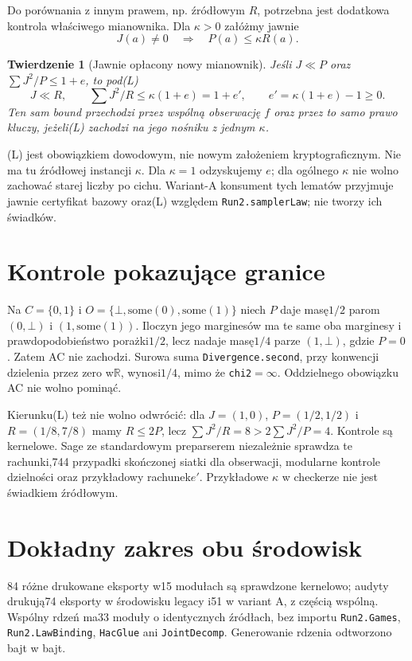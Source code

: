 \documentclass[11pt,a4paper]{article}
\newcommand{\code}[1]{\nolinkurl{#1}}
\newtheorem{theorem}{Twierdzenie}
\begin{document}
Do porównania z innym prawem, np. źródłowym $R$, potrzebna jest dodatkowa
kontrola właściwego mianownika. Dla $\kappa>0$ załóżmy jawnie
\[
 J(a)\ne0\quad\Longrightarrow\quad P(a)\le\kappa R(a).
\tag{L}
\]
\begin{theorem}[Jawnie opłacony nowy mianownik]
Jeśli $J\ll P$ oraz $\sum J^2/P\le1+e$, to pod(L)
\[
 J\ll R,\qquad \sum J^2/R\le\kappa(1+e)
       =1+e',\qquad e'=\kappa(1+e)-1\ge0.
\]
Ten sam bound przechodzi przez wspólną obserwację $f$ oraz przez to samo
prawo kluczy, jeżeli(L) zachodzi na jego nośniku z jednym $\kappa$.
\end{theorem}
(L) jest obowiązkiem dowodowym, nie nowym założeniem kryptograficznym.
Nie ma tu źródłowej instancji $\kappa$. Dla $\kappa=1$ odzyskujemy $e$;
dla ogólnego $\kappa$ nie wolno zachować starej liczby po cichu.
Wariant-A konsument tych lematów przyjmuje jawnie certyfikat bazowy
oraz(L) względem \code{Run2.samplerLaw}; nie tworzy ich świadków.

\section{Kontrole pokazujące granice}
Na $C=\{0,1\}$ i $O=\{\bot,\mathrm{some}(0),\mathrm{some}(1)\}$
niech $P$ daje masę$1/2$ parom $(0,\bot)$ i $(1,\mathrm{some}(1))$.
Iloczyn jego marginesów ma te same oba marginesy i prawdopodobieństwo
porażki$1/2$, lecz nadaje masę$1/4$ parze $(1,\bot)$, gdzie $P=0$.
Zatem AC nie zachodzi. Surowa suma \code{Divergence.second}, przy
konwencji dzielenia przez zero w$\mathbb R$, wynosi$1/4$, mimo że
\code{chi2}$=\infty$. Oddzielnego obowiązku AC nie wolno pominąć.

Kierunku(L) też nie wolno odwrócić: dla
$J=(1,0)$, $P=(1/2,1/2)$ i $R=(1/8,7/8)$ mamy $R\le2P$, lecz
$\sum J^2/R=8>2\sum J^2/P=4$.
Kontrole są kernelowe. Sage ze standardowym preparserem niezależnie
sprawdza te rachunki,744 przypadki skończonej siatki dla obserwacji,
modularne kontrole dzielności oraz przykładowy rachunek$e'$.
Przykładowe $\kappa$ w checkerze nie jest świadkiem źródłowym.

\section{Dokładny zakres obu środowisk}
84 różne drukowane eksporty w15 modułach są sprawdzone kernelowo; audyty
drukują74 eksporty w środowisku legacy i51 w variant A, z częścią wspólną.
Wspólny rdzeń ma33 moduły o identycznych źródłach, bez importu
\code{Run2.Games}, \code{Run2.LawBinding}, \code{HacGlue} ani
\code{JointDecomp}. Generowanie rdzenia odtworzono bajt w bajt.
\end{document}
